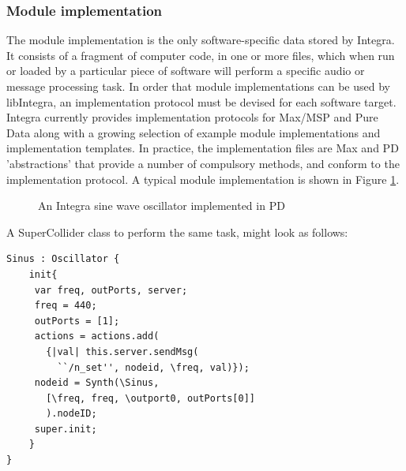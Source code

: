 \subsubsection{Module implementation}\label{subsubsec:module_implementation}

The module implementation is the only software-specific data stored by
Integra. It consists of a fragment of computer code, in one or more
files, which when run or loaded by a particular piece of software will
perform a specific audio or message processing task. In order that
module implementations can be used by libIntegra, an implementation
protocol must be devised for each software target. Integra currently
provides implementation protocols for Max/MSP and Pure Data along with
a growing selection of example module implementations and
implementation templates. In practice, the implementation files are
Max and PD 'abstractions' that provide a number of compulsory methods,
and conform to the implementation protocol. A typical module
implementation is shown in Figure {\ref{fig:sinus}}.

\begin{figure}
\centerline{}
\caption{An Integra sine wave oscillator implemented in PD}
\label{fig:sinus}
\end{figure}

A SuperCollider class to perform the same task, might look as follows:

{\small
\begin{verbatim}
Sinus : Oscillator {
    init{
     var freq, outPorts, server;
     freq = 440;
     outPorts = [1];
     actions = actions.add(
       {|val| this.server.sendMsg(
         ``/n_set'', nodeid, \freq, val)});
     nodeid = Synth(\Sinus, 
       [\freq, freq, \outport0, outPorts[0]]
       ).nodeID;
     super.init;
    }
}
\end{verbatim}
}

